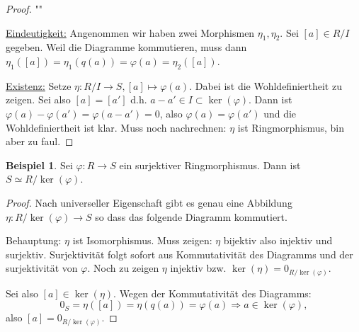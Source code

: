 \documentclass[12pt,parskip=full]{scrartcl}
\newcommand{\heading}{\underline}
\theoremstyle{definition}
\newtheorem{example}[theorem]{Beispiel}
\theoremstyle{remark}
\begin{document}
	\begin{proof}""
		
		\heading{Eindeutigkeit:} Angenommen wir haben zwei Morphismen $\eta_1, \eta_2$. Sei $[a] \in R/I$ gegeben. Weil die Diagramme kommutieren, muss dann $\eta_1([a]) = \eta_1(q(a)) = \varphi(a) = \eta_2([a])$.
		
		\heading{Existenz:} Setze $\eta: R/I \to S, [a] \mapsto \varphi(a)$. Dabei ist die Wohldefiniertheit zu zeigen. Sei also $[a] = [a']$ d.h. $a - a' \in I \subset \ker(\varphi)$. Dann ist $\varphi(a) - \varphi(a') = \varphi(a - a') = 0$, also $\varphi(a) = \varphi(a')$ und die Wohldefiniertheit ist klar. Muss noch nachrechnen: $\eta$ ist Ringmorphismus, bin aber zu faul.
	\end{proof}

	\begin{example}
		Sei $\varphi: R \to S$ ein surjektiver Ringmorphismus. Dann ist $S \simeq R/\ker(\varphi)$.
	\end{example}

	\begin{proof}
		Nach universeller Eigenschaft gibt es genau eine Abbildung $\eta: R/\ker(\varphi) \to S$ so dass das folgende Diagramm kommutiert.
		
		\begin{center}
		\end{center}
		
		Behauptung: $\eta$ ist Isomorphismus. Muss zeigen: $\eta$ bijektiv also injektiv und surjektiv. Surjektivität folgt sofort aus Kommutativität des Diagramms und der surjektivität von $\varphi$. Noch zu zeigen $\eta$ injektiv bzw. $\ker(\eta) = 0_{R/\ker(\varphi)}$.
		
		Sei also $[a] \in \ker(\eta)$. Wegen der Kommutativität des Diagramms:
		\begin{equation*}
			0_S = \eta([a]) = \eta(q(a)) = \varphi(a) \Rightarrow a \in \ker(\varphi),
		\end{equation*}
		also $[a] = 0_{R/\ker(\varphi)}$.
	\end{proof}
\end{document}
